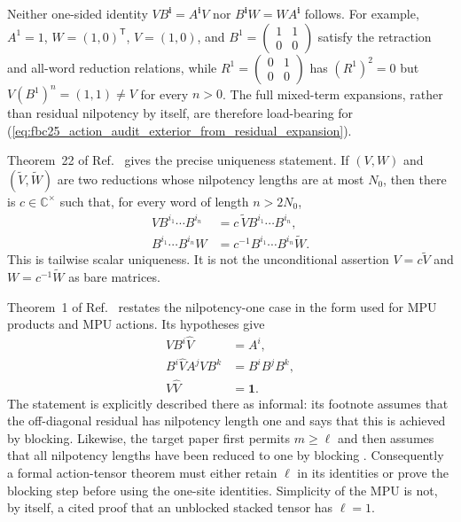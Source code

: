 \documentclass{article}
\begin{document}
Neither one-sided identity $VB^{\mathbf i}=A^{\mathbf i}V$ nor
$B^{\mathbf i}W=WA^{\mathbf i}$ follows.  For example,
$A^1=1$, $W=(1,0)^{\mathsf T}$, $V=(1,0)$, and
$B^1=\left(\begin{smallmatrix}1&1\\0&0\end{smallmatrix}\right)$ satisfy the
retraction and all-word reduction relations, while
$R^1=\left(\begin{smallmatrix}0&1\\0&0\end{smallmatrix}\right)$ has
$(R^1)^2=0$ but $V(B^1)^n=(1,1)\ne V$ for every $n>0$.  The full mixed-term
expansions, rather than residual nilpotency by itself, are therefore
load-bearing for
(\ref{eq:fbc25_action_audit_exterior_from_residual_expansion}).

Theorem~22 of Ref.~\cite[source lines~3154--3162, with proof at
lines~3990--4035]{Molnar2018SemiInjective} gives the precise uniqueness
statement.  If $(V,W)$ and $(\widetilde V,\widetilde W)$ are two reductions
whose nilpotency lengths are at most $N_0$, then there is
$c\in\mathbb C^\times$ such that, for every word of length $n>2N_0$,
\begin{align}
    VB^{i_1}\cdots B^{i_n}
        &=c\,\widetilde V B^{i_1}\cdots B^{i_n},
    \label{eq:fbc25_action_audit_reduction_left_uniqueness}\\
    B^{i_1}\cdots B^{i_n}W
        &=c^{-1}B^{i_1}\cdots B^{i_n}\widetilde W.
    \label{eq:fbc25_action_audit_reduction_right_uniqueness}
\end{align}
This is tailwise scalar uniqueness.  It is not the unconditional assertion
$V=c\widetilde V$ and $W=c^{-1}\widetilde W$ as bare matrices.

Theorem~1 of Ref.~\cite[source lines~358--377]{GarreRubioSchuch2024DomainWall}
restates the nilpotency-one case in the form used for MPU products and MPU
actions.  Its hypotheses give
\begin{align}
    VB^i\widehat V
        &=A^i,
    \label{eq:fbc25_action_audit_domain_wall_reduction}\\
    B^i\widehat V A^j V B^k
        &=B^iB^jB^k,
    \label{eq:fbc25_action_audit_domain_wall_exterior}\\
    V\widehat V
        &=\mathbf 1.
    \label{eq:fbc25_action_audit_domain_wall_retraction}
\end{align}
The statement is explicitly described there as informal: its footnote assumes
that the off-diagonal residual has nilpotency length one and says that this is
achieved by blocking.  Likewise, the target paper first permits
$m\geq\ell$ and then assumes that all nilpotency lengths have been reduced to
one by blocking
\cite[lines~1870--1874]{FrancoRubio2025MPUGauging}.  Consequently a formal
action-tensor theorem must either retain $\ell$ in its identities or prove the
blocking step before using the one-site identities.  Simplicity of the MPU is
not, by itself, a cited proof that an unblocked stacked tensor has
$\ell=1$.
\end{document}
